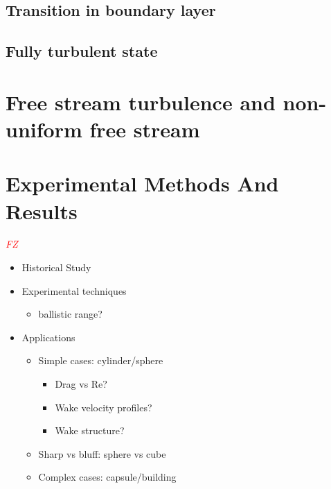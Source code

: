 \documentclass[journal]{new-aiaa}
\begin{document}
\subsection{Transition in boundary layer}




\subsection{Fully turbulent state}








\section{Free stream turbulence and non-uniform free stream}










\section{Experimental Methods And Results} \label{sec:experimentalmethods}

\textcolor{red}{\emph{FZ}}

\begin{itemize}
    \item Historical Study
    \item Experimental techniques
    \begin{itemize}
        \item ballistic range?
    \end{itemize}
    \item Applications
    \begin{itemize}
        \item Simple cases: cylinder/sphere
        \begin{itemize}
            \item Drag vs Re?
            \item Wake velocity profiles?
            \item Wake structure?
        \end{itemize}
        \item Sharp vs bluff: sphere vs cube
        \item Complex cases: capsule/building
    \end{itemize}
\end{itemize}
\end{document}
